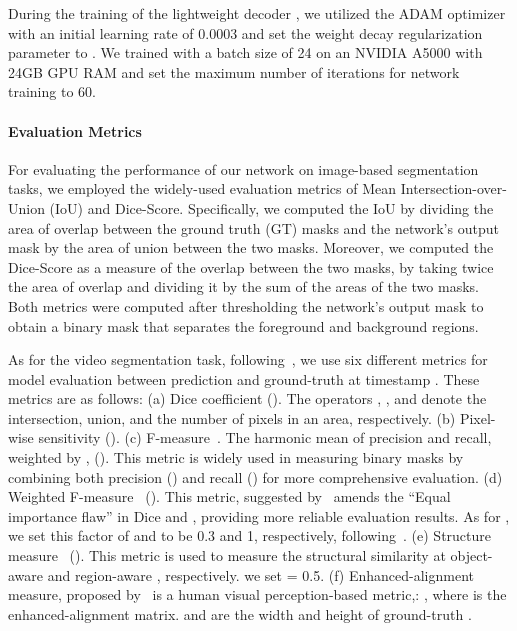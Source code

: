 \documentclass[runningheads]{llncs}
\begin{document}
During the training of the lightweight decoder , we utilized the ADAM optimizer with an initial learning rate of 0.0003 and set the weight decay regularization parameter to . We trained with a batch size of 24 on an NVIDIA A5000 with 24GB GPU RAM and set the maximum number of iterations for network training to 60.


\paragraph{Evaluation Metrics} For evaluating the performance of our network on image-based segmentation tasks, we employed the widely-used evaluation metrics of Mean Intersection-over-Union (IoU) and Dice-Score. Specifically, we computed the IoU by dividing the area of overlap between the ground truth (GT) masks and the network's output mask by the area of union between the two masks. Moreover, we computed the Dice-Score as a measure of the overlap between the two masks, by taking twice the area of overlap and dividing it by the sum of the areas of the two masks. Both metrics were computed after thresholding the network's output mask to obtain a binary mask that separates the foreground and background regions. 

As for the video segmentation task, following~\cite{ji2022video}, we use six different metrics for model evaluation between prediction  and ground-truth  at timestamp . These metrics are as follows:
(a) Dice coefficient ().
The operators , , and  denote the intersection, union, and the number of pixels in an area, respectively.
(b) Pixel-wise sensitivity ().
(c) F-measure~\cite{achanta2009frequency}. The harmonic mean of precision and recall, weighted by , ().
This metric is widely used in measuring binary masks by combining both precision () and recall () for more comprehensive evaluation.
(d) Weighted F-measure~\cite{margolin2014evaluate} (). This metric, suggested by~\cite{fan2021cognitive,cheng2021structure} amends the ``Equal importance flaw'' in Dice and , providing more reliable evaluation results. As for  , we set this factor of  and  to be 0.3 and 1, respectively, following~\cite{ji2022video,borji2015salient}.
(e) Structure measure~\cite{fan2017structure} ().
This metric is used to measure the structural similarity at object-aware  and region-aware , respectively.
we set  = 0.5.
(f) Enhanced-alignment measure, proposed by~\cite{fan2018enhanced} is a human visual perception-based metric,: , where  is the enhanced-alignment matrix.
 and  are the width and height of ground-truth .
\end{document}
